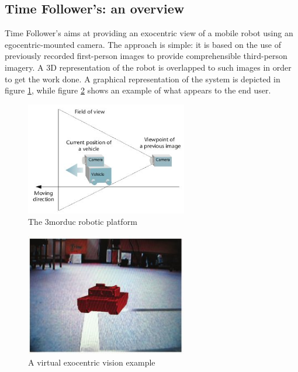 \subsection{Time Follower's: an overview}
Time Follower's aims at providing an exocentric view of a mobile 
robot using an egocentric-mounted camera. The approach is simple: it is 
based on the use of previously recorded first-person images to provide 
comprehensible third-person imagery. A 3D representation of the robot 
is overlapped to such images in order to get the work done. A graphical
representation of the system is depicted in figure \ref{fig:exocentric}, 
while figure \ref{fig:virtualexocentric} shows an example of what appears 
to the end user.
%
\begin{figure}[!h]
  \begin{center}
    \includegraphics[width=200pt]{img/exocentric_vision.jpg}
    \caption{The 3morduc robotic platform}
    \label{fig:exocentric}
  \end{center}
\end{figure}
%
\begin{figure}[!h]
  \begin{center}
    \includegraphics[width=200pt]{img/virtual_exocentric.jpg}  %
    \caption{A virtual exocentric vision example}
    \label{fig:virtualexocentric}
  \end{center}
\end{figure}
%

